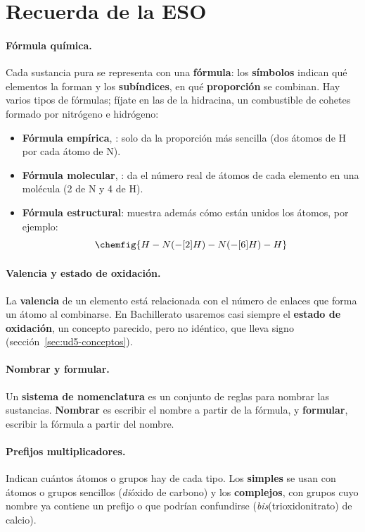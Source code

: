 \section{Recuerda de la ESO}\label{sec:ud5-eso}

\paragraph{Fórmula química.} Cada sustancia pura se representa con una \textbf{fórmula}: los \textbf{símbolos} indican qué
elementos la forman y los \textbf{subíndices}, en qué \textbf{proporción} se combinan. Hay varios tipos de fórmulas; fíjate en
las de la hidracina, un combustible de cohetes formado por nitrógeno e hidrógeno:
\begin{itemize}
    \item \textbf{Fórmula empírica}, : solo da la proporción más sencilla (dos átomos de H por cada átomo de N).
    \item \textbf{Fórmula molecular}, : da el número real de átomos de cada elemento en una molécula (2 de N y 4 de H).
    \item \textbf{Fórmula estructural}: muestra además cómo están unidos los átomos, por ejemplo:
    \[ \chemfig{H-N(-[2]H)-N(-[6]H)-H} \]
\end{itemize}

\paragraph{Valencia y estado de oxidación.} La \textbf{valencia} de un elemento está relacionada con el número de enlaces que
forma un átomo al combinarse. En Bachillerato usaremos casi siempre el \textbf{estado de oxidación}, un concepto parecido, pero no
idéntico, que lleva signo (sección~\ref{sec:ud5-conceptos}).

\paragraph{Nombrar y formular.} Un \textbf{sistema de nomenclatura} es un conjunto de reglas para nombrar las sustancias.
\textbf{Nombrar} es escribir el nombre a partir de la fórmula, y \textbf{formular}, escribir la fórmula a partir del nombre.

\paragraph{Prefijos multiplicadores.} Indican cuántos átomos o grupos hay de cada tipo. Los \textbf{simples} se usan con
átomos o grupos sencillos (\textit{di}óxido de carbono) y los \textbf{complejos}, con grupos cuyo nombre ya contiene un prefijo
o que podrían confundirse (\textit{bis}(trioxidonitrato) de calcio).

